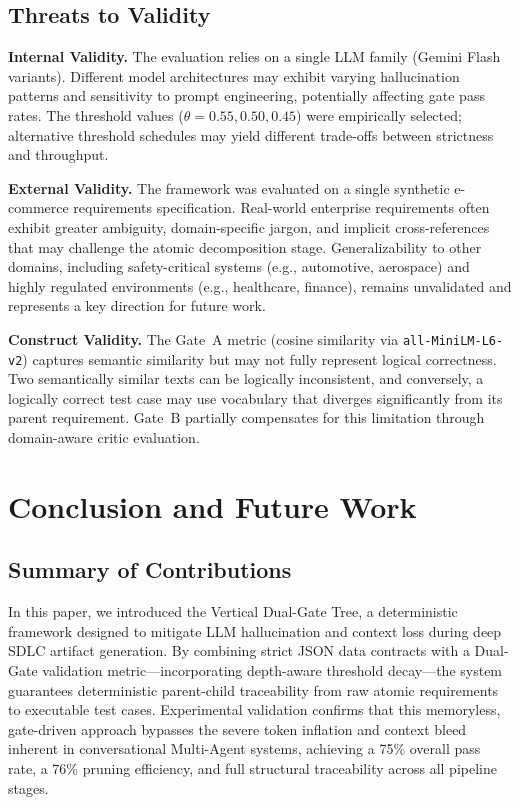 \documentclass[journal]{IEEEtran}
\begin{document}
\subsection{Threats to Validity}
\textbf{Internal Validity.} The evaluation relies on a single LLM family (Gemini Flash variants). Different model architectures may exhibit varying hallucination patterns and sensitivity to prompt engineering, potentially affecting gate pass rates. The threshold values ($\theta = 0.55, 0.50, 0.45$) were empirically selected; alternative threshold schedules may yield different trade-offs between strictness and throughput.

\textbf{External Validity.} The framework was evaluated on a single synthetic e-commerce requirements specification. Real-world enterprise requirements often exhibit greater ambiguity, domain-specific jargon, and implicit cross-references that may challenge the atomic decomposition stage. Generalizability to other domains, including safety-critical systems (e.g., automotive, aerospace) and highly regulated environments (e.g., healthcare, finance), remains unvalidated and represents a key direction for future work.

\textbf{Construct Validity.} The Gate~A metric (cosine similarity via \texttt{all-MiniLM-L6-v2}) captures semantic similarity but may not fully represent logical correctness. Two semantically similar texts can be logically inconsistent, and conversely, a logically correct test case may use vocabulary that diverges significantly from its parent requirement. Gate~B partially compensates for this limitation through domain-aware critic evaluation.

\section{Conclusion and Future Work}

\subsection{Summary of Contributions}
In this paper, we introduced the Vertical Dual-Gate Tree, a deterministic framework designed to mitigate LLM hallucination and context loss during deep SDLC artifact generation. By combining strict JSON data contracts with a Dual-Gate validation metric---incorporating depth-aware threshold decay---the system guarantees deterministic parent-child traceability from raw atomic requirements to executable test cases. Experimental validation confirms that this memoryless, gate-driven approach bypasses the severe token inflation and context bleed inherent in conversational Multi-Agent systems, achieving a 75\% overall pass rate, a 76\% pruning efficiency, and full structural traceability across all pipeline stages.
\end{document}
